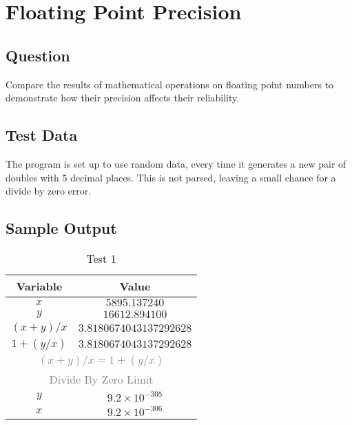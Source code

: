 \section{Floating Point Precision}
    \subsection*{Question}
        Compare the results of mathematical operations on floating point numbers
        to demonstrate how their precision affects their reliability.

    \subsection*{Test Data}
        The program is set up to use random data, every time it generates a new pair of doubles
        with 5 decimal places. This is not parsed, leaving a small chance for a divide by zero error.\\
        
    \subsection*{Sample Output}
        \begin{table}[H]
            \centering
            \begin{tabular}{c c}
                \hline
                \textbf{Variable} & \textbf{Value} \\
                \hline
                \(x\) & \(5895.137240\) \\
                \(y\) & \(16612.894100\) \\
                \hline
                \hline
                \((x + y) / x\) & \(3.8180674043137292628\) \\
                \(1 + (y / x)\) & \(3.8180674043137292628\) \\
                \multicolumn{2}{c}{\textcolor{gray}{\((x + y) / x = 1 + ( y / x)\)}} \\
                \hline
                \hline
                \multicolumn{2}{c}{\textcolor{gray}{Divide By Zero Limit}} \\
                \(y\) & \(9.2 \times 10^{-305}\) \\
                \(x\) & \(9.2 \times 10^{-306}\) \\
                \hline
            \end{tabular}
            \caption{Test 1}
        \end{table}

